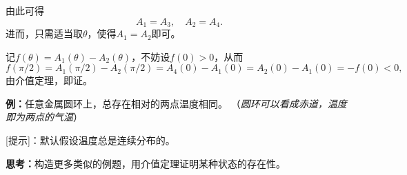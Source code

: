 \begin{center}
\end{center}

由此可得
$$A_1=A_3,\quad A_2=A_4.$$
进而，只需适当取$\theta$，使得$A_1=A_2$即可。

记$f(\theta)=A_1(\theta)-A_2(\theta)$，不妨设$f(0)>0$，从而
$$f(\pi/2)=A_1(\pi/2)-A_2(\pi/2)=A_4(0)-A_1(0)=A_2(0)-A_1(0)=-f(0)<0,$$
由介值定理，即证。

{\bf 例：}任意金属圆环上，总存在相对的两点温度相同。
（{\it 圆环可以看成赤道，温度即为两点的气温}）

[提示]：默认假设温度总是连续分布的。

{\bf 思考：}构造更多类似的例题，用介值定理证明某种状态的存在性。

% 
% 
% 
% 
% 
% 
% 

